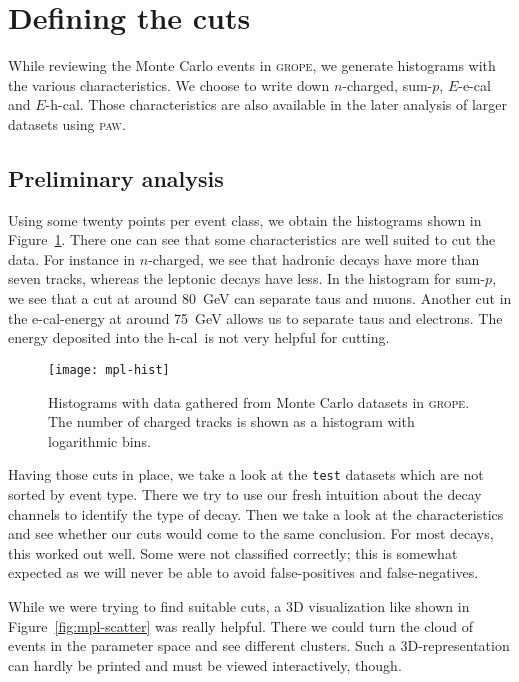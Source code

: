 \documentclass[11pt, english, fleqn, DIV=15, headinclude, BCOR=2cm]{scrreprt}
\newcommand\ecal{e-cal}
\newcommand\hcal{h-cal}
\newcommand\eecal{$E$-e-cal}
\newcommand\ehcal{$E$-h-cal}
\newcommand\sump{sum-$p$}
\newcommand\ncharged{$n$-charged}
\begin{document}
\section{Defining the cuts}

While reviewing the Monte Carlo events in \textsc{grope}, we generate
histograms with the various characteristics. We choose to write down
\ncharged{}, \sump{}, \eecal{} and \ehcal{}. Those characteristics are also
available in the later analysis of larger datasets using \textsc{paw}.

\subsection{Preliminary analysis}

Using some twenty points per event class, we obtain the histograms shown in
Figure~\ref{fig:mpl-hist}. There one can see that some characteristics are well
suited to cut the data. For instance in \ncharged, we see that hadronic
decays have more than seven tracks, whereas the leptonic decays have less. In
the histogram for \sump, we see that a cut at around
\SI{80}{\giga\electronvolt} can separate taus and muons. Another cut in the
\ecal-energy at around \SI{75}{\giga\electronvolt} allows us to separate taus
and electrons. The energy deposited into the \hcal\ is not very helpful for
cutting.

\begin{figure}
    \centering
    \texttt{[image: mpl-hist]}
    \caption{%
        Histograms with data gathered from Monte Carlo datasets in
        \textsc{grope}. The number of charged tracks is shown as a histogram
        with logarithmic bins.
    }
    \label{fig:mpl-hist}
\end{figure}

Having those cuts in place, we take a look at the \texttt{test} datasets which
are not sorted by event type. There we try to use our fresh intuition about the
decay channels to identify the type of decay. Then we take a look at the
characteristics and see whether our cuts would come to the same conclusion. For
most decays, this worked out well. Some were not classified correctly; this is
somewhat expected as we will never be able to avoid false-positives and
false-negatives.

While we were trying to find suitable cuts, a 3D visualization like shown in
Figure~\ref{fig:mpl-scatter} was really helpful. There we could turn the cloud
of events in the parameter space and see different clusters. Such a
3D-representation can hardly be printed and must be viewed interactively,
though.
\end{document}

